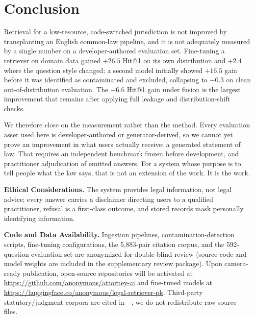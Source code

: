 \documentclass[conference]{IEEEtran}
\begin{document}
\section{Conclusion}
Retrieval for a low-resource, code-switched jurisdiction is not improved by
transplanting an English common-law pipeline, and it is not adequately measured
by a single number on a developer-authored evaluation set. Fine-tuning a
retriever on domain data gained $+26.5$ Hit@1 on its own distribution and $+2.4$
where the question style changed; a second model initially showed $+16.5$ gain
before it was identified as contaminated and excluded, collapsing to $-0.3$ on clean
out-of-distribution evaluation. The $+6.6$ Hit@1 gain under fusion is the largest
improvement that remains after applying full leakage and distribution-shift checks.

We therefore close on the measurement rather than the method. Every evaluation
asset used here is developer-authored or generator-derived, so we cannot yet
prove an improvement in what users actually receive: a generated statement of
law. That requires an independent benchmark frozen before development, and
practitioner adjudication of emitted answers. For a system whose purpose is to
tell people what the law says, that is not an extension of the work. It is the
work.

\textbf{Ethical Considerations.} The system provides legal information, not legal advice; every answer carries a disclaimer directing users to a qualified practitioner, refusal is a first-class outcome, and stored records mask personally identifying information.

\textbf{Code and Data Availability.} Ingestion pipelines, contamination-detection scripts, fine-tuning configurations, the 5{,}883-pair citation corpus, and the 592-question evaluation set are anonymized for double-blind review (source code and model weights are included in the supplementary review package). Upon camera-ready publication, open-source repositories will be activated at \url{https://github.com/anonymous/attorney-ai} and fine-tuned models at \url{https://huggingface.co/anonymous/legal-retriever-pk}. Third-party statutory/judgment corpora are cited in~\cite{paklaws}--\cite{legaluqa}; we do not redistribute raw source files.


\vspace{-3mm}


\end{document}
